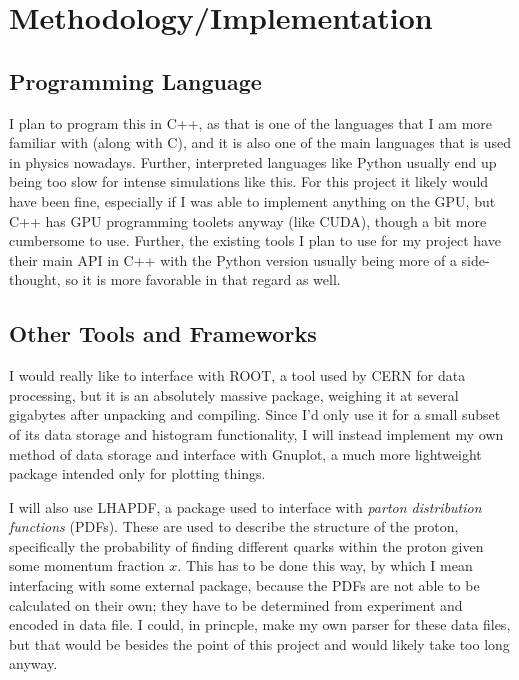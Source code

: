 \section{Methodology/Implementation}\label{sec:Method-Implem}


\subsection{Programming Language}
I plan to program this in C++, as that is one of the languages that I am more familiar with (along with C), and it is also one of the main languages that is used in physics nowadays. Further, interpreted languages like Python usually end up being too slow for intense simulations like this. For this project it likely would have been fine, especially if I was able to implement anything on the GPU, but C++ has GPU programming toolets anyway (like CUDA), though a bit more cumbersome to use. Further, the existing tools I plan to use for my project have their main API in C++ with the Python version usually being more of a side-thought, so it is more favorable in that regard as well.


\subsection{Other Tools and Frameworks}

I would really like to interface with ROOT, a tool used by CERN for data processing, but it is an absolutely massive package, weighing it at several gigabytes after unpacking and compiling. Since I'd only use it for a small subset of its data storage and histogram functionality, I will instead implement my own method of data storage and interface with Gnuplot, a much more lightweight package intended only for plotting things.

I will also use \textsc{LHAPDF}, a package used to interface with \textit{parton distribution functions} (PDFs). These are used to describe the structure of the proton, specifically the probability of finding different quarks within the proton given some momentum fraction $x$. This has to be done this way, by which I mean interfacing with some external package, because the PDFs are not able to be calculated on their own; they have to be determined from experiment and encoded in data file. I could, in princple, make my own parser for these data files, but that would be besides the point of this project and would likely take too long anyway.



